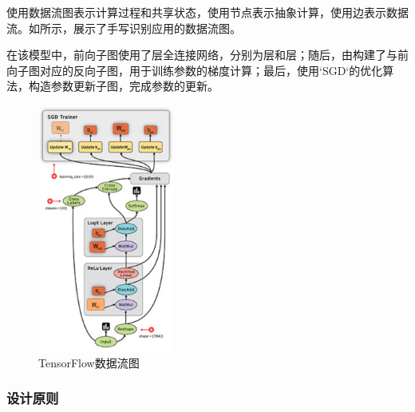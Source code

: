 \begin{content}

使用数据流图表示计算过程和共享状态，使用节点表示抽象计算，使用边表示数据流。如所示，展示了手写识别应用的数据流图。

在该模型中，前向子图使用了层全连接网络，分别为层和层；随后，由构建了与前向子图对应的反向子图，用于训练参数的梯度计算；最后，使用`SGD`的优化算法，构造参数更新子图，完成参数的更新。

\begin{figure}[!htbp]
\centering
\includegraphics[width=0.4\textwidth]{figures/tf-dataflow.png}
\caption{TensorFlow数据流图}
 \label{fig:tf-dataflow}
\end{figure}

\end{content}

\subsubsection{设计原则}

\begin{content}

\begin{enum}
\end{enum}

\end{content}


